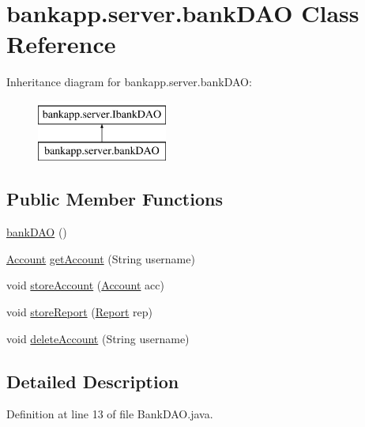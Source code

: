 \hypertarget{classbankapp_1_1server_1_1bank_d_a_o}{}\section{bankapp.\+server.\+bank\+D\+AO Class Reference}
\label{classbankapp_1_1server_1_1bank_d_a_o}
Inheritance diagram for bankapp.\+server.\+bank\+D\+AO\+:\begin{figure}[H]
\begin{center}
\leavevmode
\includegraphics[height=2.000000cm]{classbankapp_1_1server_1_1bank_d_a_o}
\end{center}
\end{figure}
\subsection*{Public Member Functions}
\begin{DoxyCompactItemize}
\item 
\hyperlink{classbankapp_1_1server_1_1bank_d_a_o_a974c7da6eea192fb2f94a98a66e5068a}{bank\+D\+AO} ()
\item 
\hyperlink{classbankapp_1_1server_1_1_account}{Account} \hyperlink{classbankapp_1_1server_1_1bank_d_a_o_ad561ee843029636f739dbfad0bfb5414}{get\+Account} (String username)
\item 
void \hyperlink{classbankapp_1_1server_1_1bank_d_a_o_a0023f065d21c23dd9b952339fd832d7e}{store\+Account} (\hyperlink{classbankapp_1_1server_1_1_account}{Account} acc)
\item 
void \hyperlink{classbankapp_1_1server_1_1bank_d_a_o_a1909f3eb0622fb32291c0d1969bdf5df}{store\+Report} (\hyperlink{classbankapp_1_1server_1_1_report}{Report} rep)
\item 
void \hyperlink{classbankapp_1_1server_1_1bank_d_a_o_a3c6e87d45ba675ea26be1d7227de0183}{delete\+Account} (String username)
\end{DoxyCompactItemize}


\subsection{Detailed Description}


Definition at line 13 of file Bank\+D\+A\+O.\+java.



